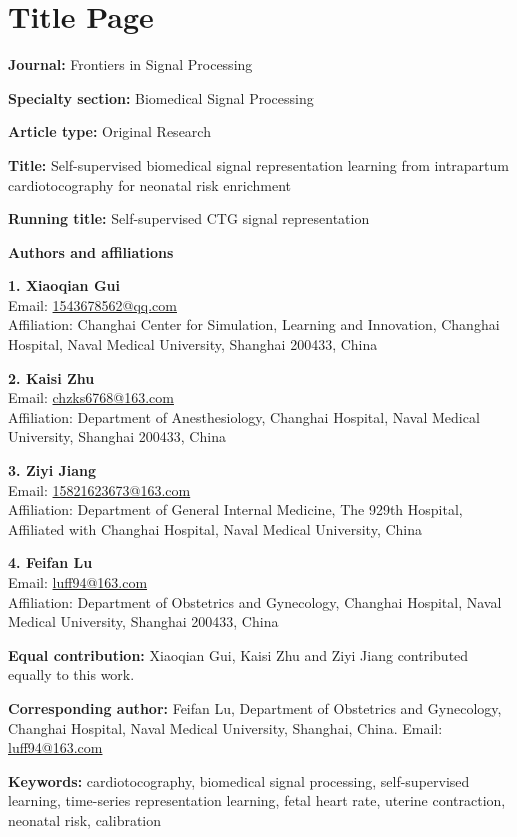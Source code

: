 \documentclass[11pt]{article}
\begin{document}
        \section*{Title Page}

        \textbf{Journal:} Frontiers in Signal Processing

        \textbf{Specialty section:} Biomedical Signal Processing

        \textbf{Article type:} Original Research

        \textbf{Title:} Self-supervised biomedical signal representation learning from intrapartum cardiotocography for neonatal risk enrichment

        \textbf{Running title:} Self-supervised CTG signal representation

        \textbf{Authors and affiliations}

        \textbf{1. Xiaoqian Gui}\\ Email: \url{1543678562@qq.com}\\ Affiliation: Changhai Center for Simulation, Learning and Innovation, Changhai Hospital, Naval Medical University, Shanghai 200433, China

\textbf{2. Kaisi Zhu}\\ Email: \url{chzks6768@163.com}\\ Affiliation: Department of Anesthesiology, Changhai Hospital, Naval Medical University, Shanghai 200433, China

\textbf{3. Ziyi Jiang}\\ Email: \url{15821623673@163.com}\\ Affiliation: Department of General Internal Medicine, The 929th Hospital, Affiliated with Changhai Hospital, Naval Medical University, China

\textbf{4. Feifan Lu}\\ Email: \url{luff94@163.com}\\ Affiliation: Department of Obstetrics and Gynecology, Changhai Hospital, Naval Medical University, Shanghai 200433, China

        \textbf{Equal contribution:} Xiaoqian Gui, Kaisi Zhu and Ziyi Jiang contributed equally to this work.

        \textbf{Corresponding author:} Feifan Lu, Department of Obstetrics and Gynecology, Changhai Hospital, Naval Medical University, Shanghai, China. Email: \url{luff94@163.com}

        \textbf{Keywords:} cardiotocography, biomedical signal processing, self-supervised learning, time-series representation learning, fetal heart rate, uterine contraction, neonatal risk, calibration
\end{document}
